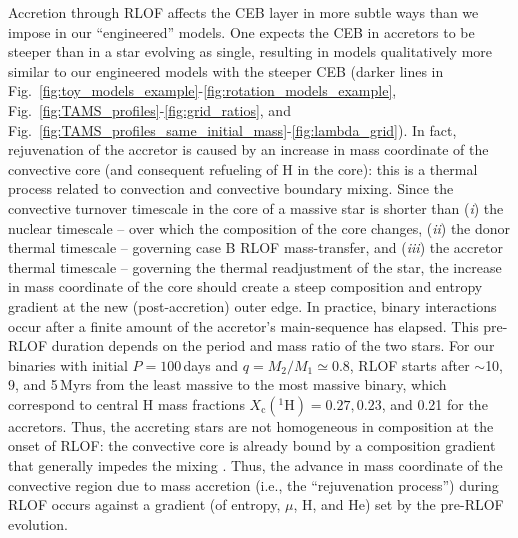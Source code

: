\documentclass[twocolumn,twocolappendix,trackchanges]{aastex63}
\DeclareRobustCommand{\Figref}[1]{Fig.~\ref{#1}}
\begin{document}
Accretion through RLOF affects the CEB layer in more subtle ways than
we impose in our ``engineered'' models. One expects the CEB in
accretors to be steeper than in a star evolving as single, resulting
in models qualitatively more similar to our engineered models with the
steeper CEB (darker lines in
\Figref{fig:toy_models_example}-\ref{fig:rotation_models_example},
\Figref{fig:TAMS_profiles}-\ref{fig:grid_ratios}, and \Figref{fig:TAMS_profiles_same_initial_mass}-\ref{fig:lambda_grid}). In fact, rejuvenation of the accretor is caused by an
increase in mass coordinate of the convective core (and consequent
refueling of H in the core): this is a thermal process related to
convection and convective boundary mixing. Since the convective
turnover timescale in the core of a massive star is shorter than
(\emph{i}) the nuclear timescale -- over which the composition of the
core changes, (\emph{ii}) the donor thermal timescale -- governing
case B RLOF mass-transfer, and (\emph{iii}) the accretor thermal
timescale -- governing the thermal readjustment of the star, the
increase in mass coordinate of the core should create a steep
composition and entropy gradient at the new (post-accretion) outer
edge. In practice, binary interactions occur after a finite amount of
the accretor's main-sequence has elapsed. This pre-RLOF duration
depends on the period and mass ratio of the two stars. For our
binaries with initial $P=100$\,days and $q=M_2/M_1\simeq 0.8$, RLOF
starts after $\sim{}$10, 9, and 5\,Myrs from the least massive to the
most massive binary, which correspond to central H mass fractions
$X_\mathrm{c}(^1\mathrm{H}) = 0.27, 0.23$, and 0.21 for the accretors.
Thus, the accreting stars are not homogeneous in composition at the
onset of RLOF: the convective core is already bound by a composition
gradient that generally impedes the mixing \citep[e.g.,][]{yoon:05}.
Thus, the advance in mass coordinate of the convective region due to mass accretion (i.e., the ``rejuvenation process'') during RLOF occurs against a gradient (of entropy,
$\mu$, H, and He) set by the pre-RLOF evolution.
\end{document}
